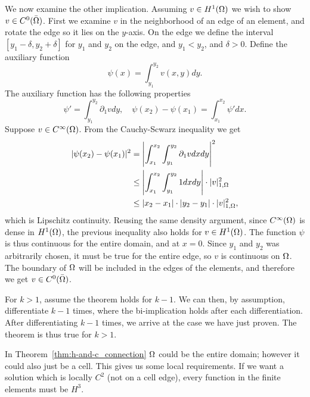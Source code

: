 \begin{bev}
    We now examine the other implication. 
    Assuming $v\in H^1(\Omega)$ we wish to show $v \in C^0(\bar{\Omega})$. 
    First we examine $v$ in the neighborhood of an edge of an element, and rotate the edge so it lies on the $y$-axis. 
    On the edge we define the interval $[y_1-\delta, y_2+\delta]$ for $y_1$ and $y_2$ on the edge, and $y_1<y_2$, and 
    $\delta > 0$.
    Define the auxiliary function
    \begin{equation}
        \psi (x) = \int_{y_1}^{y_2} v(x,y) dy.
    \end{equation}
    The auxiliary function has the following properties
    \begin{equation}
        \psi ' =\int_{y_1}^{y_2} \partial_1 v dy, \quad \psi(x_2) - \psi(x_1) =\int_{x_1}^{x_2} \psi ' dx.
    \end{equation}
    Suppose $v \in C^{\infty}(\Omega)$. From the Cauchy-Scwarz inequality we get
    \begin{align}
        |\psi(x_2) -\psi(x_1)|^2 &= \left| \int_{x_1}^{x_2} \int_{y_1}^{y_2} \partial_1 v dx dy \right|^2\\
        &\leq \left| \int_{x_1}^{x_2} \int_{y_1}^{y_2} 1 dx dy \right| \cdot | v |_{1, \Omega}^2\\
        &\leq |x_2 - x_1| \cdot |y_2 - y_1| \cdot | v |_{1, \Omega}^2,
    \end{align}
    which is Lipschitz continuity.
    Reusing the same density argument, since $C^\infty(\Omega)$ is dense in $H^1(\Omega)$, the previous inequality 
    also holds for $v\in H^1(\Omega)$.
    The function $\psi$ is thus continuous for the entire domain, and at $x=0$. 
    Since $y_1$ and $y_2$ was arbitrarily chosen, it must be true for the entire edge,
    so $v$ is continuous on $\Omega$. 
    The boundary of $\Omega$ will be included in the edges of the elements,
    and therefore we get $v\in C^0(\bar{\Omega})$.

    For $k>1$, assume the theorem holds for $k-1$. We can then, by assumption, differentiate 
    $k-1$ times, where the bi-implication holds after each differentiation. 
    After differentiating $k-1$ times, we arrive at the case we have just proven. 
    The theorem is thus true for $k>1$.
\end{bev}
In Theorem~\ref{thm:h-and-c_connection} $\Omega$ could be the entire domain; 
however it could also just be a cell. This gives us some local requirements. 
If we want a solution which is locally $C^2$ (not on a cell edge), every function in the 
finite elements must be $H^3$.